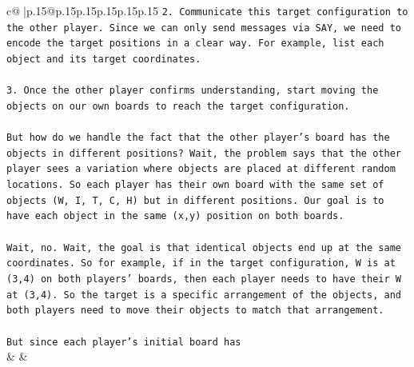 \documentclass{article}
\begin{document}
{\begin{supertabular}{c@{$\;$}|p{.15\linewidth}@{}p{.15\linewidth}p{.15\linewidth}p{.15\linewidth}p{.15\linewidth}p{.15\linewidth}}
{{{\texttt{2. Communicate this target configuration to the other player. Since we can only send messages via SAY, we need to encode the target positions in a clear way. For example, list each object and its target coordinates.} \\
\\ 
\texttt{3. Once the other player confirms understanding, start moving the objects on our own boards to reach the target configuration.} \\
\\ 
\texttt{But how do we handle the fact that the other player's board has the objects in different positions? Wait, the problem says that the other player sees a variation where objects are placed at different random locations. So each player has their own board with the same set of objects (W, I, T, C, H) but in different positions. Our goal is to have each object in the same (x,y) position on both boards.} \\
\\ 
\texttt{Wait, no. Wait, the goal is that identical objects end up at the same coordinates. So for example, if in the target configuration, W is at (3,4) on both players' boards, then each player needs to have their W at (3,4). So the target is a specific arrangement of the objects, and both players need to move their objects to match that arrangement.} \\
\\ 
\texttt{But since each player's initial board has} \\
            }
        }
    }
    & & \\ \\


\end{supertabular}}
\end{document}

